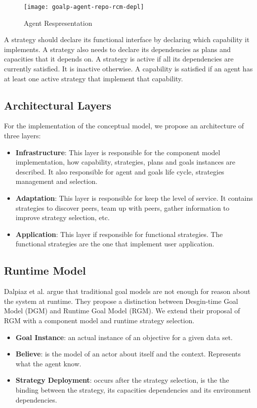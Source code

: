 \begin{figure}
  \centering
  \texttt{[image: goalp-agent-repo-rcm-depl]}
  \caption{Agent Respresentation}
  \label{fig:goalp-agent}
\end{figure}

A strategy should declare its functional interface by declaring which capability it implements. A strategy also needs to declare its dependencies as plans and capacities that it depends on. A strategy is active if all its dependencies are currently satisfied. It is inactive otherwise. A capability is satisfied if an agent has at least one active strategy that implement that capability.

\subsection{Architectural Layers}

For the implementation of the conceptual model, we propose an architecture of three layers:

\begin{itemize}
  \item \textbf{Infrastructure}: This layer is responsible for the component model implementation, how capability, strategies, plans and goals instances are described. It also responsible for agent and goals life cycle, strategies management and selection.
  \item \textbf{Adaptation}: This layer is responsible for keep the level of service. It contains strategies to discover peers, team up with peers, gather information to improve strategy selection, etc.
  \item \textbf{Application}: This layer if responsible for functional strategies. The functional strategies are the one that implement user application.
\end{itemize}

\subsection{Runtime Model}

Dalpiaz et al. \cite{dalpiaz_runtime_2013} argue that traditional goal models are not enough for reason about the system at runtime. They propose a distinction between Desgin-time Goal Model (DGM) and Runtime Goal Model (RGM). We extend their proposal of RGM with a component model and runtime strategy selection.

\begin{itemize}

\item \textbf{Goal Instance}: an actual instance of an objective for a given data set.

\item \textbf{Believe}: is the model of an actor about itself and the context. Represents what the agent know.

\item \textbf{Strategy Deployment}: occurs after the strategy selection, is the the binding between the strategy, its capacities dependencies and its environment dependencies.

\end{itemize}

